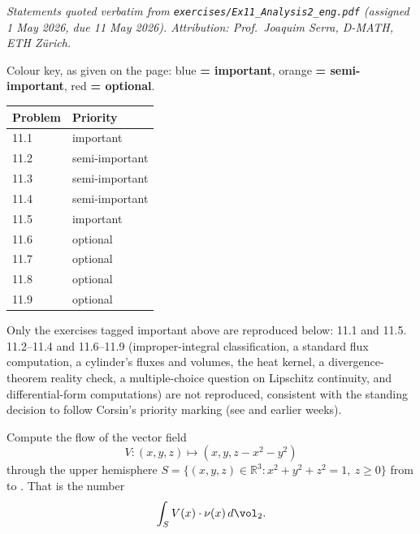 \textit{Statements quoted verbatim from \texttt{exercises/Ex11\_Analysis2\_eng.pdf} (assigned
1 May 2026, due 11 May 2026). Attribution: Prof.\ Joaquim Serra, D-MATH, ETH Z\"urich.}

\begin{ainote}
Colour key, as given on the page: blue \textbf{= important}, orange \textbf{= semi-important},
red \textbf{= optional}.

\begin{center}
\begin{tabular}{@{}l l@{}}
\textbf{Problem} & \textbf{Priority} \\
\hline
11.1 & important \\
11.2 & semi-important \\
11.3 & semi-important \\
11.4 & semi-important \\
11.5 & important \\
11.6 & optional \\
11.7 & optional \\
11.8 & optional \\
11.9 & optional \\
\end{tabular}
\end{center}
\end{ainote}

\begin{ainote}
Only the exercises tagged important above are reproduced below: 11.1 and 11.5. 11.2--11.4 and
11.6--11.9 (improper-integral classification, a standard flux computation, a cylinder's fluxes
and volumes, the heat kernel, a divergence-theorem reality check, a multiple-choice question on
Lipschitz continuity, and differential-form computations) are not reproduced, consistent with
the standing decision to follow Corsin's priority marking (see  and
earlier weeks).
\end{ainote}

\begin{exercise}
\label{ex:11.1}
Compute the flow of the vector field
\[V : (x,y,z) \mapsto (x,y,z-x^2-y^2)\]
through the upper hemisphere $S = \{(x,y,z)\in\mathbb{R}^3 : x^2+y^2+z^2=1,\ z\geq0\}$ from
 to . That is the number
\[\int_S V(x)\cdot\nu(x)\,d\vol_2.\]
\end{exercise}

